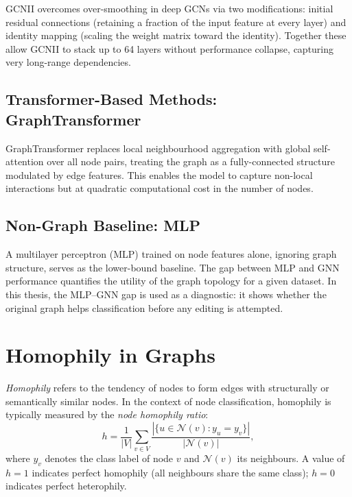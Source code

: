 GCNII \cite{chen2020gcnii} overcomes over-smoothing in deep GCNs via two modifications:
initial residual connections (retaining a fraction of the input feature at every layer) and
identity mapping (scaling the weight matrix toward the identity). Together these allow
GCNII to stack up to 64 layers without performance collapse, capturing very long-range
dependencies.

\subsection{Transformer-Based Methods: GraphTransformer}

GraphTransformer \cite{shi2021graphtrans} replaces local neighbourhood aggregation with
global self-attention over all node pairs, treating the graph as a fully-connected
structure modulated by edge features. This enables the model to capture non-local
interactions but at quadratic computational cost in the number of nodes.

\subsection{Non-Graph Baseline: MLP}

A multilayer perceptron (MLP) trained on node features alone, ignoring graph structure,
serves as the lower-bound baseline. The gap between MLP and GNN performance quantifies
the utility of the graph topology for a given dataset. In this thesis, the MLP--GNN gap is
used as a diagnostic: it shows whether the original graph helps classification before any
editing is attempted.

\section{Homophily in Graphs}

\textit{Homophily} refers to the tendency of nodes to form edges with structurally or
semantically similar nodes. In the context of node classification, homophily is typically
measured by the \textit{node homophily ratio}:
\begin{equation}
    h = \frac{1}{|V|} \sum_{v \in V}
    \frac{\left|\{u \in \mathcal{N}(v) : y_u = y_v\}\right|}{|\mathcal{N}(v)|},
    \label{eq:homophily}
\end{equation}
where $y_v$ denotes the class label of node $v$ and $\mathcal{N}(v)$ its neighbours.
A value of $h = 1$ indicates perfect homophily (all neighbours share the same class);
$h = 0$ indicates perfect heterophily.


